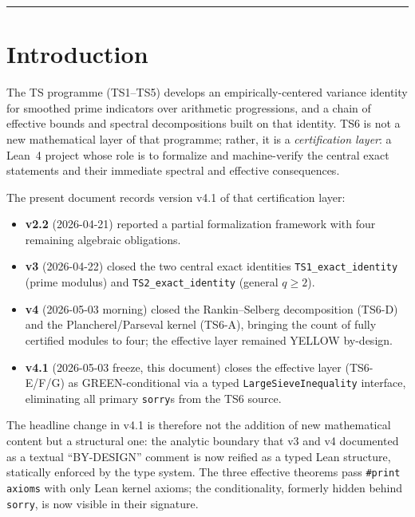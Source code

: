 \documentclass[11pt,a4paper]{article}
\theoremstyle{definition}
\begin{document}
\tableofcontents

\bigskip
\hrule
\bigskip

\section{Introduction}

The TS programme (TS1--TS5) develops an empirically-centered variance identity for smoothed prime indicators over arithmetic progressions, and a chain of effective bounds and spectral decompositions built on that identity. TS6 is not a new mathematical layer of that programme; rather, it is a \emph{certification layer}: a Lean~4 project whose role is to formalize and machine-verify the central exact statements and their immediate spectral and effective consequences.

The present document records version v4.1 of that certification layer:
\begin{itemize}[noitemsep]
\item \textbf{v2.2} (2026-04-21) reported a partial formalization framework with four remaining algebraic obligations.
\item \textbf{v3} (2026-04-22) closed the two central exact identities \verb|TS1_exact_identity| (prime modulus) and \verb|TS2_exact_identity| (general $q \geq 2$).
\item \textbf{v4} (2026-05-03 morning) closed the Rankin--Selberg decomposition (TS6-D) and the Plancherel/Parseval kernel (TS6-A), bringing the count of fully certified modules to four; the effective layer remained YELLOW by-design.
\item \textbf{v4.1} (2026-05-03 freeze, this document) closes the effective layer (TS6-E/F/G) as GREEN-conditional via a typed \verb|LargeSieveInequality| interface, eliminating all primary \texttt{sorry}s from the TS6 source.
\end{itemize}

The headline change in v4.1 is therefore not the addition of new mathematical content but a structural one: the analytic boundary that v3 and v4 documented as a textual ``BY-DESIGN'' comment is now reified as a typed Lean structure, statically enforced by the type system. The three effective theorems pass \verb|#print axioms| with only Lean kernel axioms; the conditionality, formerly hidden behind \texttt{sorry}, is now visible in their signature.
\end{document}
